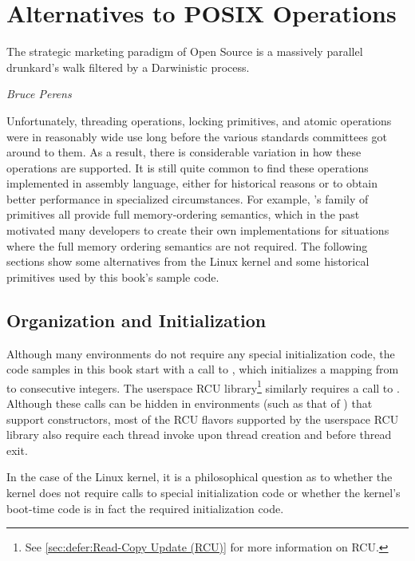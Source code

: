 \section{Alternatives to POSIX Operations}
\label{sec:toolsoftrade:Alternatives to POSIX Operations}
%
\epigraph{The strategic marketing paradigm of Open Source is a massively
	  parallel drunkard's walk filtered by a Darwinistic process.}
	 {\emph{Bruce Perens}}

Unfortunately, threading operations, locking primitives, and atomic
operations were in reasonably wide use long before the various standards
committees got around to them.
As a result, there is considerable variation in how these operations
are supported.
It is still quite common to find these operations implemented in
assembly language, either for historical reasons or to obtain better
performance in specialized circumstances.
For example, \GCC's  family of primitives all provide full
memory-ordering semantics, which in the past motivated many developers
to create their own implementations for situations where the full memory
ordering semantics are not required.
The following sections show some alternatives from the Linux kernel
and some historical primitives used by this book's sample code.

\subsection{Organization and Initialization}
\label{sec:toolsoftrade:Organization and Initialization}

Although many environments do not require any special initialization
code, the code samples in this book start with a call to ,
which initializes a mapping from  to consecutive integers.
The userspace RCU library\footnote{
	See \cref{sec:defer:Read-Copy Update (RCU)} for more information
	on RCU\@.}
similarly requires a call to .
Although these calls can be hidden in environments (such as that of
\GCC) that support constructors,
most of the RCU flavors supported by the userspace RCU library
also require each thread invoke  upon thread
creation and  before thread exit.

In the case of the Linux kernel, it is a philosophical question as to
whether the kernel does not require calls to special initialization
code or whether the kernel's boot-time code is in fact the required
initialization code.

